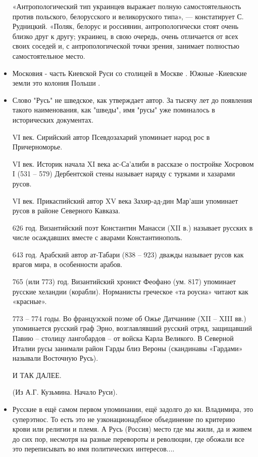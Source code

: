 \begin{itemize}
«Антропологический тип украинцев выражает полную самостоятельность против
польского, белорусского и великоруского типа», — констатирует С. Рудницкий.
«Поляк, белорус и россиянин, антропологически стоят очень близко друг к другу;
украинец, в свою очередь, очень отличается от всех своих соседей и, с
антропологической точки зрения, занимает полностью самостоятельное место.

\item {}

Московия - часть Киевской Руси со столицей в Москве . Южные -Киевские земли это
колония Польши .

\item {}

Слово "Русь" не шведское, как утверждает автор. За тысячу лет до появления такого наименования, как "шведы", имя "русы" уже поминалось в исторических документах.

VI век. Сирийский автор Псевдозахарий упоминает народ рос в Причерноморье.

VI век. Историк начала XI века ас-Са'алиби в рассказе о постройке Хосровом I (531 – 579) Дербентской стены называет наряду с турками и хазарами русов.

VI век. Прикаспийский автор XV века Захир-ад-дин Мар'аши упоминает русов в районе Северного Кавказа.

626 год. Византийский поэт Константин Манасси (XII в.) называет русских в числе осаждавших вместе с аварами Константинополь.

643 год. Арабский автор ат-Табари (838 – 923) дважды называет русов как врагов мира, в особенности арабов.

765 (или 773) год. Византийский хронист Феофано (ум. 817) упоминает русские хеландии (корабли). Норманисты греческое «та роусиа» читают как «красные».

773 – 774 годы. Во французской поэме об Ожье Датчанине (XII – XIII вв.) упоминается русский граф Эрно, возглавлявший русский отряд, защищавший Павию – столицу лангобардов – от войска Карла Великого. В Северной Италии русы занимали район Гарды близ Вероны (скандинавы «Гардами» называли Восточную Русь).

И ТАК ДАЛЕЕ.

(Из А.Г. Кузьмина. Начало Руси).

\item {}

Русские в ещё самом первом упоминании, ещё задолго до кн. Владимира, это
суперэтнос. То есть это не узконационадбное объединение по критерию крови или
религии и племя. А Русь (Россия) место где мы жили, да и живем до сих пор,
несмотря на разные перевороты и революции, где обожали все это переписывать во
имя политических интересов....


\end{itemize}
